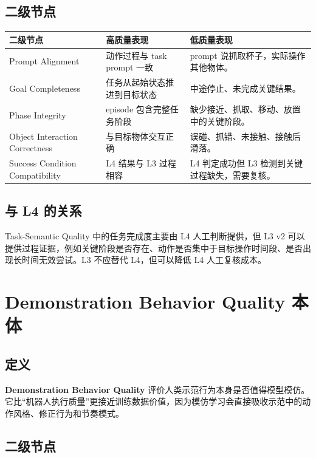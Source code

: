 \documentclass[UTF8,zihao=-4,oneside,openany]{ctexrep}
\newcommand{\Term}[1]{\textbf{#1}}
\begin{document}
\subsection{二级节点}

\begin{longtable}{L{3.2cm} L{5.2cm} L{5.2cm}}
\toprule
二级节点 & 高质量表现 & 低质量表现 \\
\midrule
Prompt Alignment & 动作过程与 task prompt 一致 & prompt 说抓取杯子，实际操作其他物体。 \\
Goal Completeness & 任务从起始状态推进到目标状态 & 中途停止、未完成关键结果。 \\
Phase Integrity & episode 包含完整任务阶段 & 缺少接近、抓取、移动、放置中的关键阶段。 \\
Object Interaction Correctness & 与目标物体交互正确 & 误碰、抓错、未接触、接触后滑落。 \\
Success Condition Compatibility & L4 结果与 L3 过程相容 & L4 判定成功但 L3 检测到关键过程缺失，需要复核。 \\
\bottomrule
\end{longtable}

\subsection{与 L4 的关系}

Task-Semantic Quality 中的任务完成度主要由 L4 人工判断提供，但 L3 v2 可以提供过程证据，例如关键阶段是否存在、动作是否集中于目标操作时间段、是否出现长时间无效尝试。L3 不应替代 L4，但可以降低 L4 人工复核成本。

\section{Demonstration Behavior Quality 本体}

\subsection{定义}

\Term{Demonstration Behavior Quality} 评价人类示范行为本身是否值得模型模仿。它比“机器人执行质量”更接近训练数据价值，因为模仿学习会直接吸收示范中的动作风格、修正行为和节奏模式。

\subsection{二级节点}
\end{document}
